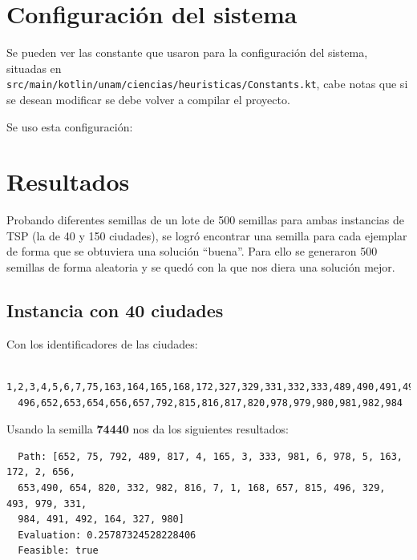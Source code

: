 \documentclass{article}
\begin{document}
\section{Configuración del sistema}
Se pueden ver las constante que usaron para la configuración del sistema, situadas en\\
\texttt{src/main/kotlin/unam/ciencias/heuristicas/Constants.kt}, cabe notas que si se desean
modificar se debe volver a compilar el proyecto.

Se uso esta configuración:



\section{Resultados}
Probando diferentes semillas de un lote de 500 semillas para ambas instancias de TSP (la de 40 y 150
ciudades), se logró encontrar una semilla para cada ejemplar de forma que se obtuviera una solución
``buena''. Para ello se generaron 500 semillas de forma aleatoria y se quedó con la que nos
diera una solución mejor.

\subsection{Instancia con 40 ciudades}
Con los identificadores de las ciudades:
\begin{verbatim}
  1,2,3,4,5,6,7,75,163,164,165,168,172,327,329,331,332,333,489,490,491,492,493,
  496,652,653,654,656,657,792,815,816,817,820,978,979,980,981,982,984  
\end{verbatim}

Usando la semilla \textbf{74440} nos da los siguientes resultados:
\begin{verbatim}
  Path: [652, 75, 792, 489, 817, 4, 165, 3, 333, 981, 6, 978, 5, 163, 172, 2, 656,
  653,490, 654, 820, 332, 982, 816, 7, 1, 168, 657, 815, 496, 329, 493, 979, 331,
  984, 491, 492, 164, 327, 980]
  Evaluation: 0.25787324528228406
  Feasible: true
\end{verbatim}
\end{document}
